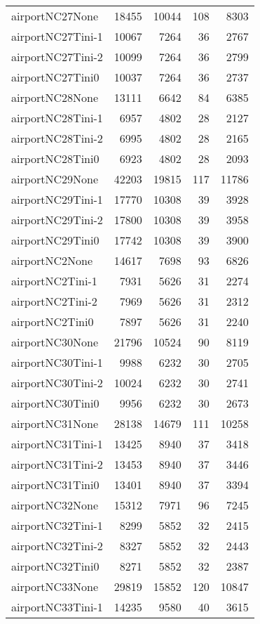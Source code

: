 \begin{longtable}{lrrrr}
airportNC27None & 18455 & 10044 & 108 & 8303 \\
airportNC27Tini-1 & 10067 & 7264 & 36 & 2767 \\
airportNC27Tini-2 & 10099 & 7264 & 36 & 2799 \\
airportNC27Tini0 & 10037 & 7264 & 36 & 2737 \\
airportNC28None & 13111 & 6642 & 84 & 6385 \\
airportNC28Tini-1 & 6957 & 4802 & 28 & 2127 \\
airportNC28Tini-2 & 6995 & 4802 & 28 & 2165 \\
airportNC28Tini0 & 6923 & 4802 & 28 & 2093 \\
airportNC29None & 42203 & 19815 & 117 & 11786 \\
airportNC29Tini-1 & 17770 & 10308 & 39 & 3928 \\
airportNC29Tini-2 & 17800 & 10308 & 39 & 3958 \\
airportNC29Tini0 & 17742 & 10308 & 39 & 3900 \\
airportNC2None & 14617 & 7698 & 93 & 6826 \\
airportNC2Tini-1 & 7931 & 5626 & 31 & 2274 \\
airportNC2Tini-2 & 7969 & 5626 & 31 & 2312 \\
airportNC2Tini0 & 7897 & 5626 & 31 & 2240 \\
airportNC30None & 21796 & 10524 & 90 & 8119 \\
airportNC30Tini-1 & 9988 & 6232 & 30 & 2705 \\
airportNC30Tini-2 & 10024 & 6232 & 30 & 2741 \\
airportNC30Tini0 & 9956 & 6232 & 30 & 2673 \\
airportNC31None & 28138 & 14679 & 111 & 10258 \\
airportNC31Tini-1 & 13425 & 8940 & 37 & 3418 \\
airportNC31Tini-2 & 13453 & 8940 & 37 & 3446 \\
airportNC31Tini0 & 13401 & 8940 & 37 & 3394 \\
airportNC32None & 15312 & 7971 & 96 & 7245 \\
airportNC32Tini-1 & 8299 & 5852 & 32 & 2415 \\
airportNC32Tini-2 & 8327 & 5852 & 32 & 2443 \\
airportNC32Tini0 & 8271 & 5852 & 32 & 2387 \\
airportNC33None & 29819 & 15852 & 120 & 10847 \\
airportNC33Tini-1 & 14235 & 9580 & 40 & 3615 \\

\end{longtable}
